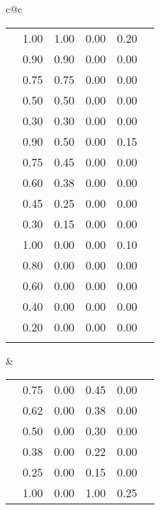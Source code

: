 \begin{table}[!ht]
\begin{center}
\begin{scriptsize}
\begin{tabular}{c@{\quad}c}
\begin{tabular}{|c|c|cccc|}
      \clspc
      \clrow{verydarkblue}             & 1.00 & 1.00 & 0.00 & 0.20 \\
      \clrow{darkblue}                 & 0.90 & 0.90 & 0.00 & 0.00 \\
      \clrow{blue}                     & 0.75 & 0.75 & 0.00 & 0.00 \\
      \clrow{lightblue}                & 0.50 & 0.50 & 0.00 & 0.00 \\
      \clrow{verylightblue}            & 0.30 & 0.30 & 0.00 & 0.00 \\
      \clspc
      \clrow{verydarkskyblue}          & 0.90 & 0.50 & 0.00 & 0.15 \\
      \clrow{darkskyblue}              & 0.75 & 0.45 & 0.00 & 0.00 \\
      \clrow{skyblue}                  & 0.60 & 0.38 & 0.00 & 0.00 \\
      \clrow{lightskyblue}             & 0.45 & 0.25 & 0.00 & 0.00 \\
      \clrow{verylightskyblue}         & 0.30 & 0.15 & 0.00 & 0.00 \\
      \clspc
      \clrow{verydarkcyan}             & 1.00 & 0.00 & 0.00 & 0.10 \\
      \clrow{darkcyan}                 & 0.80 & 0.00 & 0.00 & 0.00 \\
      \clrow{cyan}                     & 0.60 & 0.00 & 0.00 & 0.00 \\
      \clrow{lightcyan}                & 0.40 & 0.00 & 0.00 & 0.00 \\
      \clrow{verylightcyan}            & 0.20 & 0.00 & 0.00 & 0.00 \\
      \clspc
      \hline
    \end{tabular} 
   &
    \begin{tabular}{|c|c|cccc|} \hline
      \clspc
      \clrow{verydarkseagreen}         & 0.75 & 0.00 & 0.45 & 0.00 \\
      \clrow{darkseagreen}             & 0.62 & 0.00 & 0.38 & 0.00 \\
      \clrow{seagreen}                 & 0.50 & 0.00 & 0.30 & 0.00 \\
      \clrow{lightseagreen}            & 0.38 & 0.00 & 0.22 & 0.00 \\
      \clrow{verylightseagreen}        & 0.25 & 0.00 & 0.15 & 0.00 \\
      \clspc
      \clrow{verydarkgreen}            & 1.00 & 0.00 & 1.00 & 0.25 \\

\end{tabular}
\end{tabular}
\end{scriptsize}
\end{center}
\end{table}
